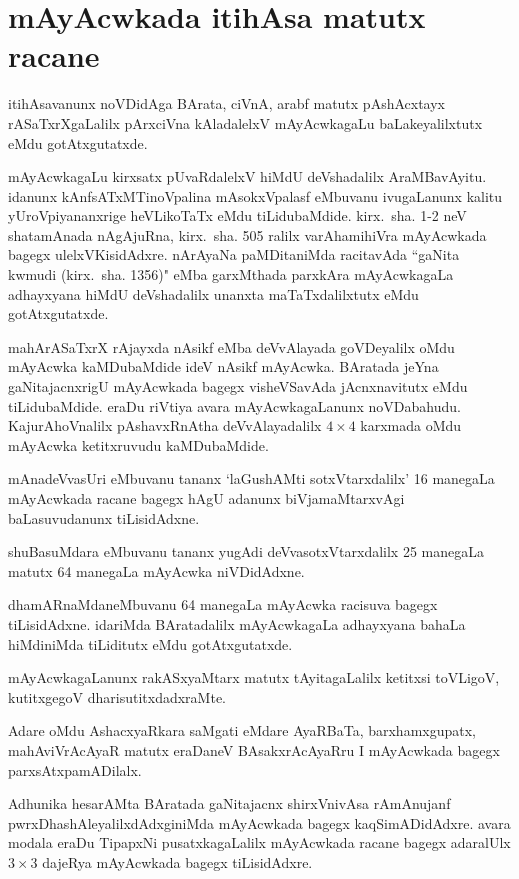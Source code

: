 \chapter{mAyAcwkada itihAsa matutx racane}

itihAsavanunx noVDidAga BArata, ciVnA, arabf matutx pAshAcxtayx rASaTxrXgaLalilx pArxciVna kAladalelxV mAyAcwkagaLu baLakeyalilxtutx eMdu gotAtxgutatxde.
\vskip 2pt

mAyAcwkagaLu kirxsatx pUvaRdalelxV hiMdU deVshadalilx AraMBavAyitu. idanunx kAnfsATxMTinoVpalina mAsokxVpalasf eMbuvanu ivugaLanunx kalitu yUroVpiyananxrige heVLikoTaTx eMdu tiLidubaMdide. kirx.~sha. {\rm 1-2} neV shatamAnada nAgAjuRna, kirx.~sha. {\rm 505} ralilx varAhamihiVra mAyAcwkada bagegx ulelxVKisidAdxre. nArAyaNa paMDitaniMda racitavAda ``gaNita kwmudi (kirx.~sha. {\rm 1356})" eMba garxMthada parxkAra mAyAcwkagaLa adhayxyana hiMdU deVshadalilx unanxta maTaTxdalilxtutx eMdu gotAtxgutatxde.
\vskip 2pt

mahArASaTxrX rAjayxda nAsikf eMba deVvAlayada goVDeyalilx oMdu mAyAcwka kaMDubaMdide ideV nAsikf mAyAcwka. BAratada jeYna gaNitajacnxrigU mAyAcwkada bagegx visheVSavAda jAcnxnavitutx eMdu tiLidubaMdide. eraDu riVtiya avara mAyAcwkagaLanunx noVDabahudu. KajurAhoVnalilx pAshavxRnAtha deVvAlayadalilx $4\times 4$ karxmada oMdu mAyAcwka ketitxruvudu kaMDubaMdide.
\vskip 2pt

mAnadeVvasUri eMbuvanu tananx `laGushAMti sotxVtarxdalilx' {\rm 16} manegaLa mAyAcwkada racane bagegx hAgU adanunx biVjamaMtarxvAgi baLasuvudanunx tiLisi\-dAdxne.
\vskip 2pt

shuBasuMdara eMbuvanu tananx yugAdi deVvasotxVtarxdalilx {\rm 25} manegaLa matutx {\rm 64} manegaLa mAyAcwka niVDidAdxne.
\newpage

dhamARnaMdaneMbuvanu {\rm 64} manegaLa mAyAcwka racisuva bagegx tiLisidAdxne. idariMda BAratadalilx mAyAcwkagaLa adhayxyana bahaLa hiMdiniMda tiLiditutx eMdu gotAtxgutatxde.

mAyAcwkagaLanunx rakASxyaMtarx matutx tAyitagaLalilx ketitxsi toVLigoV, kutitxgegoV dharisutitxdadxraMte.

Adare oMdu AshacxyaRkara saMgati eMdare AyaRBaTa, barxhamxgupatx, mahAviVrA\-cAyaR matutx eraDaneV BAsakxrAcAyaRru I mAyAcwkada bagegx parxsAtxpamADilalx.

Adhunika hesarAMta BAratada gaNitajacnx shirxVnivAsa rAmAnujanf pwrxDhashAleyalilx\-dAdxginiMda mAyAcwkada bagegx kaqSimADidAdxre. avara modala eraDu TipapxNi pusatxka\-gaLalilx mAyAcwkada racane bagegx adaralUlx $3\times 3$ dajeRya mAyAcwkada bagegx tiLisidAdxre.

